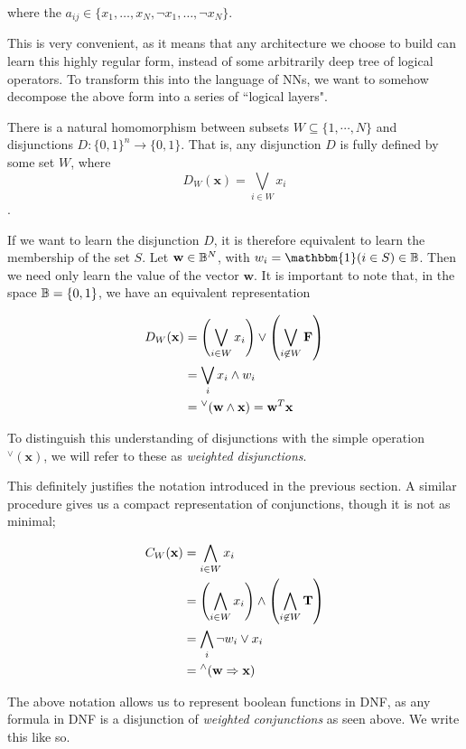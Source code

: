 \documentclass[conference]{report}
\begin{document}
where the $a_{ij} \in \{x_1, \dots, x_N, \lnot x_1, \dots, \lnot x_N\}$.

This is very convenient, as it means that any architecture we choose to build can learn this highly regular form, instead of some arbitrarily deep tree of logical operators. To transform this into the language of NNs, we want to somehow decompose the above form into a series of ``logical layers". 

There is a natural homomorphism between subsets $W \subseteq \{1, \cdots, N\}$ and disjunctions $D : \{0,1\}^n \to \{0,1\}$. That is, any disjunction $D$ is fully defined by some set $W$, where
$$D_W(\mathbf{x}) = \bigvee_{i\in W} x_i$$.

If we want to learn the disjunction $D$, it is therefore equivalent to learn the membership of the set $S$. Let $\mathbf{w} \in \mathbb{B}^N$, with $w_i = \mathbbm{1}(i \in S) \in \B$. Then we need only learn the value of the vector $\mathbf{w}$. It is important to note that, in the space $\mathbb{B} = \{0,1\}$, we have an equivalent representation

$$
\begin{aligned}
D_W(\mathbf{x}) 
&= \left(\bigvee_{i \in W} x_i\right) \lor \left(\bigvee_{i \not\in W} \textbf{F}\right) \\
&= \bigvee_{i} x_i \land w_i \\
&= {^\lor}(\mathbf{w \land x}) = \mathbf{w}^T\mathbf{x}
\end{aligned}
$$

To distinguish this understanding of disjunctions with the simple operation $^\lor(\mathbf{x})$, we will refer to these as \textit{weighted disjunctions}.

This definitely justifies the notation introduced in the previous section. A similar procedure gives us a compact representation of conjunctions, though it is not as minimal;

$$
\begin{aligned}
C_W(\mathbf{x}) 
&= \bigwedge_{i \in W} x_i \\
&= \left(\bigwedge_{i \in W} x_i\right) \land \left(\bigwedge_{i \not\in W} \textbf{T} \right) \\
&= \bigwedge_i \neg w_i \lor x_i \\
&= {^\land}(\mathbf{w} \Rightarrow \mathbf{x})
\end{aligned}
$$

The above notation allows us to represent boolean functions in DNF, as any formula in DNF is a disjunction of \textit{weighted conjunctions} as seen above. We write this like so.
\end{document}
